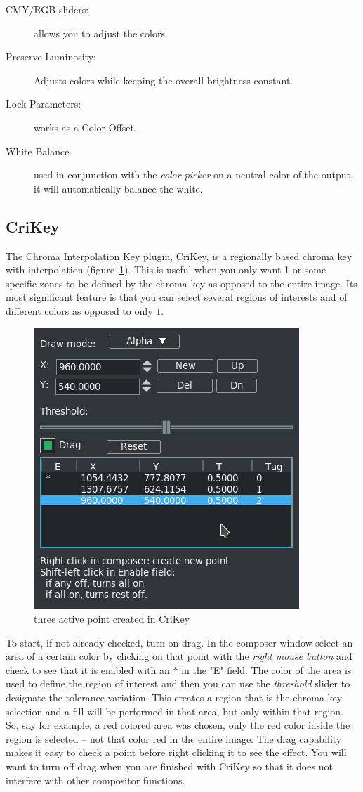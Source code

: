 \begin{description}
    \item[CMY/RGB sliders:] allows you to adjust the colors.
    \item[Preserve Luminosity:] Adjusts colors while keeping the overall brightness constant.
    \item[Lock Parameters:] works as a Color Offset.
    \item[White Balance] used in conjunction with the \textit{color picker} on a neutral color of the output, it will automatically balance the white.
\end{description}

\subsection{CriKey}%
\label{sub:crikey}

The Chroma Interpolation Key plugin, CriKey, is a regionally based chroma key with interpolation (figure~\ref{fig:crikey}). This is useful when you only want 1 or some specific zones to be defined by the chroma key as opposed to the entire image. Its most significant feature is that you can select several regions of interests and of different colors as opposed to only $1$.

\begin{figure}[htpb]
    \centering
    \includegraphics[width=0.6\linewidth]{images/crikey.png}
    \caption{three active point created in CriKey}
    \label{fig:crikey}
\end{figure}

To start, if not already checked, turn on drag. In the composer window select an area of a certain color by clicking on that point with the \textit{right mouse button} and check to see that it is enabled with an $*$ in the "E" field. The color of the area is used to define the region of interest and then you can use the \textit{threshold} slider to designate the tolerance variation. This creates a region that is the chroma key selection and a fill will be performed in that area, but only within that region. So, say for example, a red colored area was chosen, only the red color inside the region is selected -- not that color red in the entire image. The drag capability makes it easy to check a point before right clicking it to see the effect. You will want to turn off drag when you are finished with CriKey so that it does not interfere with other compositor functions.

